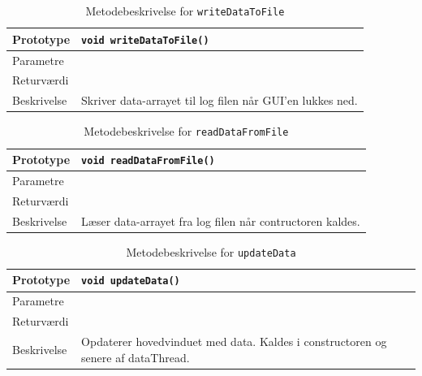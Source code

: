 \begin{table}[H]
\begin{tabularx}{\textwidth}{| L{2.5 cm} | Z |} \hline
Prototype & \texttt{void writeDataToFile()} \\\hline
Parametre &  \\\hline
Returværdi &  \\\hline
Beskrivelse & Skriver data-arrayet til log filen når GUI'en lukkes ned.  \\\hline
\end{tabularx}
\caption{Metodebeskrivelse for \texttt{writeDataToFile}}
\label{table:met_writeDataToFile}
\end{table}

\begin{table}[H]
\begin{tabularx}{\textwidth}{| L{2.5 cm} | Z |} \hline
Prototype & \texttt{void readDataFromFile()} \\\hline
Parametre &  \\\hline
Returværdi &  \\\hline
Beskrivelse & Læser data-arrayet fra log filen når contructoren kaldes.  \\\hline
\end{tabularx}
\caption{Metodebeskrivelse for \texttt{readDataFromFile}}
\label{table:met_readDataFromFile}
\end{table}

\begin{table}[H]
\begin{tabularx}{\textwidth}{| L{2.5 cm} | Z |} \hline
Prototype & \texttt{void updateData()} \\\hline
Parametre &  \\\hline
Returværdi &  \\\hline
Beskrivelse & Opdaterer hovedvinduet med data. Kaldes i constructoren og senere af dataThread.   \\\hline
\end{tabularx}
\caption{Metodebeskrivelse for \texttt{updateData}}
\label{table:met_updateData}
\end{table}

\clearpage
